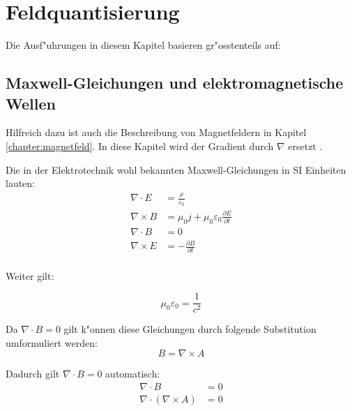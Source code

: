 \chapter{Feldquantisierung\label{chapter:feldquantisierung}}
\begin{refsection}

\printbibliography[heading=subbibliography]
\end{refsection}

Die Ausf"uhrungen in diesem Kapitel basieren gr"osstenteils auf: \cite{fq:aqm}

\section{Maxwell-Gleichungen und elektromagnetische Wellen}

Hilfreich dazu ist auch die Beschreibung von Magnetfeldern in Kapitel \ref{chapter:magnetfeld}. In diese Kapitel wird der Gradient durch $\nabla$ ersetzt \cite{fq:nabla}.

Die in der Elektrotechnik wohl bekannten Maxwell-Gleichungen in SI Einheiten lauten:
\begin{equation}
\begin{split}
\nabla\cdot E &= \frac{\rho}{\varepsilon_0} \\
\nabla\times B &= \mu_0 j  + \mu_0 \varepsilon_0\frac{\partial E}{\partial t} \\
\nabla\cdot B &=0 \\
\nabla\times E &= -\frac{\partial B }{\partial t}\\
\end{split}
\end{equation}

Weiter gilt:

\begin{equation}
\mu_0\varepsilon_0=\frac{1}{c^2}
\end{equation}

Da $\nabla \cdot B = 0 $ gilt k"onnen diese Gleichungen durch folgende Substitution umformuliert werden:
\begin{equation}
B = \nabla\times A 
\end{equation}

Dadurch gilt $\nabla \cdot B = 0 $ automatisch:
\begin{align}
\nabla \cdot B &= 0 \\
\nabla \cdot ( \nabla\times A ) &= 0
\end{align}

